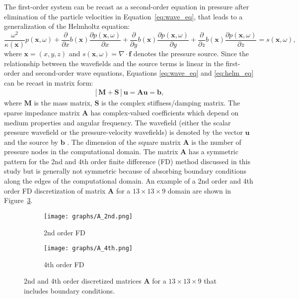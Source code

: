 \documentclass[12pt]{article}
\begin{document}
The first-order system can be recast as a second-order equation in pressure after elimination of the particle velocities in Equation~\ref{eq:wave_eq}, that leads to a generalization of the Helmholtz equation:
\begin{equation}\label{eq:helm_eq}
	\frac{\omega^2}{\kappa(\mathbf{x})}p(\mathbf{x},\omega)+\frac{\partial}{\partial x}b(\mathbf{x})\frac{\partial p(\mathbf{x},\omega)}{\partial x} + \frac{\partial}{\partial y}b(\mathbf{x})\frac{\partial p(\mathbf{x},\omega)}{\partial y}+\frac{\partial}{\partial z}b(\mathbf{x})\frac{\partial p(\mathbf{x},\omega)}{\partial z} = s(\mathbf{x},\omega),
\end{equation}
where $\mathbf{x}=(x,y,z)$ and $s(\mathbf{x},\omega)= \nabla \cdot \mathbf{f}$ denotes the pressure source. Since the relationship between the wavefields and the source terms is linear in the first-order and second-order wave equations, Equations \ref{eq:wave_eq} and \ref{eq:helm_eq} can be recast in matrix form:
\begin{equation}\label{eq:matrix_form}
	\begin{split}
		[\mathbf{M}+\mathbf{S}]\mathbf{u}=\mathbf{Au}=\mathbf{b},	
	\end{split}
\end{equation}
where $\mathbf{M}$ is the mass matrix, $\mathbf{S}$ is the complex stiffness/damping matrix. The sparse impedance matrix $\mathbf{A}$ has complex-valued coefficients which depend on medium properties and angular frequency. The wavefield (either the scalar pressure wavefield or the pressure-velocity wavefields) is denoted by the vector $\mathbf{u}$ and the source by $\mathbf{b}$ \citep{marfurt1984accuracy}. The dimension of the square matrix $\mathbf{A}$ is the number of pressure nodes in the computational domain. The matrix $\mathbf{A}$ has a symmetric pattern for the 2nd and 4th order finite difference (FD) method discussed in this study but is generally not symmetric because of absorbing boundary conditions along the edges of the computational domain. An example of a 2nd order and 4th order FD discretization of matrix \textbf{A} for a $13 \times 13 \times 9$ domain are shown in Figure~\ref{fig:A_matrices}.

\begin{figure}
\begin{subfigure}{.5\textwidth}
  \centering
  \texttt{[image: graphs/A\_2nd.png]}
  \caption{2nd order FD}
  \label{A_2nd}
\end{subfigure}
\begin{subfigure}{.5\textwidth}
  \centering
  \texttt{[image: graphs/A\_4th.png]}
  \caption{4th order FD}
  \label{fig:A_4th}
\end{subfigure}
\caption{2nd and 4th order discretized matrices \textbf{A} for a $13 \times 13 \times 9$ that includes boundary conditions.}
\label{fig:A_matrices}
\end{figure}
\end{document}
